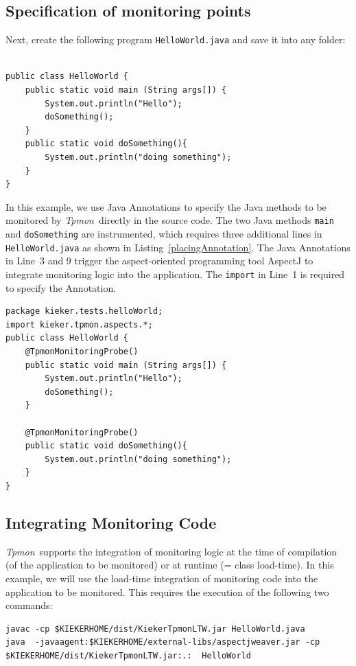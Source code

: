 \documentclass[a4paper,12pt]{scrartcl}
\newcommand{\tpmon}{\textit{Tpmon}}
\begin{document}
\subsection{Specification of monitoring points}\label{sec.tutorial.annotation}
Next, create the following program \texttt{HelloWorld.java} and save it into any folder:
\begin{lstlisting}[caption={\texttt{HelloWorld.java}},label={lst1}]

public class HelloWorld {	
	public static void main (String args[]) {
		System.out.println("Hello");
		doSomething();
	}
	public static void doSomething(){
		System.out.println("doing something");
	}
}
\end{lstlisting}

In this example, we use Java Annotations to specify the Java methods to be monitored by \tpmon\ directly in the source code. The two Java methods \texttt{main} and \texttt{doSomething} are instrumented, which requires three additional lines in \texttt{HelloWorld.java} as shown in Listing~\ref{placingAnnotation}. The Java Annotations in Line~3 and 9 trigger the aspect-oriented programming tool AspectJ to integrate monitoring logic into the application. The \texttt{import} in Line~1 is required to specify the Annotation.

\begin{lstlisting}[caption={Lines 1, 3 and 9 are added to instrument this simple ``Hello World'' Java program.},label={placingAnnotation}]
package kieker.tests.helloWorld;
import kieker.tpmon.aspects.*;
public class HelloWorld {
	@TpmonMonitoringProbe()
	public static void main (String args[]) {
		System.out.println("Hello");
		doSomething();
	}
	
	@TpmonMonitoringProbe()
	public static void doSomething(){
		System.out.println("doing something");
	}
}
\end{lstlisting}

\subsection{Integrating Monitoring Code}
\tpmon\ supports the integration of monitoring logic at the time of compilation (of the application to be monitored) or at runtime (= class load-time). In this example, we will use the load-time integration of monitoring code into the application to be monitored. This requires the execution of the following two commands:

\begin{lstlisting}[caption={Compilation and execution with AspectJ's Java agent.},label={javaHelloWorld}]
javac -cp $KIEKERHOME/dist/KiekerTpmonLTW.jar HelloWorld.java
java  -javaagent:$KIEKERHOME/external-libs/aspectjweaver.jar -cp $KIEKERHOME/dist/KiekerTpmonLTW.jar:.:  HelloWorld
\end{lstlisting}
\end{document}
